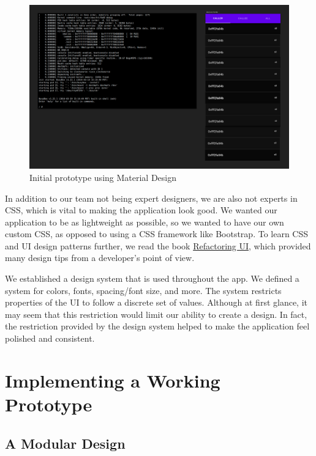 \begin{figure}[H]
  \includegraphics[scale=0.26]{prototype2}
  \caption{Initial prototype using Material Design}
  \label{fig:proto2}
  \centering
\end{figure}

In addition to our team not being expert designers, we are also not experts in CSS, which
is vital to making the application look good. We wanted our application to be as
lightweight as possible, so we wanted to have our own custom CSS, as opposed to using a CSS
framework like Bootstrap. To learn CSS and UI design
patterns further, we read the book \href{https://refactoringui.com/}{Refactoring UI}, which
provided many design tips from a developer's point of view.

We established a design system that is used throughout the app. We defined a system for colors,
fonts, spacing/font size, and more. The system restricts properties of the UI to follow a discrete
set of values. Although at first glance, it may seem that this restriction would limit our ability
to create a design. In fact, the restriction provided by the design system helped to make
the application feel polished and consistent.


\section{Implementing a Working Prototype}

\subsection*{A Modular Design}

